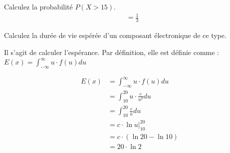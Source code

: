 \begin{exo}
\begin{subexo}{Calculez la probabilité $P(X > 15)$.}
\begin{align*}
			&= \frac{1}{3}
		\end{align*}
	\end{subexo}
	\begin{subexo}{Calculez la durée de vie espérée d'un composant électronique de ce type.}
		\begin{center}
			Il s'agit de calculer l'espérance. Par définition, elle est définie comme : $E(x) = \displaystyle\int_{-\infty}^{\infty}{u\cdot f(u)}du$
		\end{center}
		\begin{align*}
			E(x) &= \displaystyle\int_{-\infty}^{\infty}{u\cdot f(u)}du \\
			&= \displaystyle\int_{10}^{20}{u \cdot \frac{c}{u^2}}du \\ 
			&= \displaystyle\int_{10}^{20}{\frac{c}{u}}du \\ 
			&= c\cdot \ln{u}\bigg\vert_{10}^{20} \\
			&= c \cdot (\ln{20} - \ln{10}) \\
			&= 20 \cdot \ln{2}
		\end{align*}
	\end{subexo}
\end{exo}
